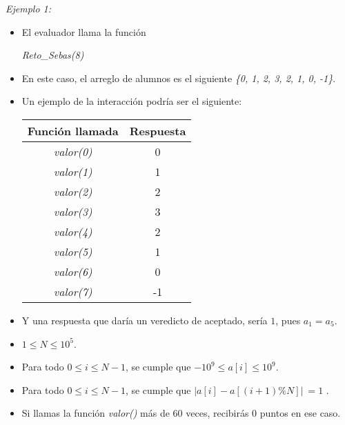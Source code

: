 \documentclass[12pt]{scrartcl}
\begin{document}
        {\itshape Ejemplo 1:}
        \begin{itemize}
            \item El evaluador llama la función 

            \begin{center}
                {\itshape Reto\_Sebas(8)}
            \end{center}

            \item En este caso, el arreglo de alumnos es el siguiente {\itshape \{0, 1, 2, 3, 2, 1, 0, -1\}}.
            \item Un ejemplo de la interacción podría ser el siguiente:
            \begin{center}
                \begin{tabular}{|c|c|}
                    \hline
                     Función llamada & Respuesta \\
                     \hline
                     {\itshape valor(0)} & 0 \\
                     \hline
                     {\itshape valor(1)} & 1 \\
                     \hline
                     {\itshape valor(2)} & 2 \\
                     \hline
                     {\itshape valor(3)} & 3 \\
                     \hline
                     {\itshape valor(4)} & 2 \\
                     \hline
                     {\itshape valor(5)} & 1 \\
                     \hline
                     {\itshape valor(6)} & 0 \\
                     \hline
                     {\itshape valor(7)} & -1 \\
                     \hline
                \end{tabular}
            \end{center}
            \item Y una respuesta que daría un veredicto de aceptado, sería $1$, pues $a_1 = a_5$.
        \end{itemize}

        
        
        \begin{itemize}
            \item $1 \le N \le 10^5$.
            \item Para todo $0 \le i \le N - 1$, se cumple que $-10^9 \le a[i] \le 10^9$.
            \item Para todo $0 \le i \le N - 1$, se cumple que $\lvert a[i] - a[(i + 1)\%N] \lvert \ = 1$ .
            \item Si llamas la función {\itshape valor()} más de 60 veces, recibirás 0 puntos en ese caso.
        \end{itemize}
    
\end{document}
